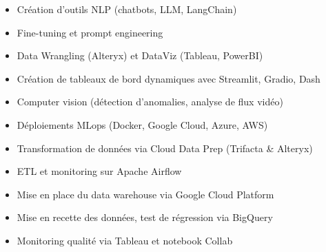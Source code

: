 \documentclass[10pt,a4paper,ragged2e,withhyper]{altacv}
\begin{document}



\makecvheader


\begin{paracol}{2}


\begin{itemize}
\item Création d’outils NLP (chatbots, LLM, LangChain)
\item Fine-tuning et prompt engineering
\item Data Wrangling (Alteryx) et DataViz (Tableau, PowerBI)
\item Création de tableaux de bord dynamiques avec Streamlit, Gradio, Dash
\item Computer vision (détection d'anomalies, analyse de flux vidéo)
\item Déploiements MLops (Docker, Google Cloud, Azure, AWS)
\end{itemize}

\divider

\begin{itemize}
\item Transformation de données via Cloud Data Prep (Trifacta \& Alteryx)
\item ETL et monitoring sur Apache Airflow
\item Mise en place du data warehouse via Google Cloud Platform
\item Mise en recette des données, test de régression via BigQuery
\item Monitoring qualité via Tableau et notebook Collab
\end{itemize}

\divider


\end{paracol}
\end{document}
